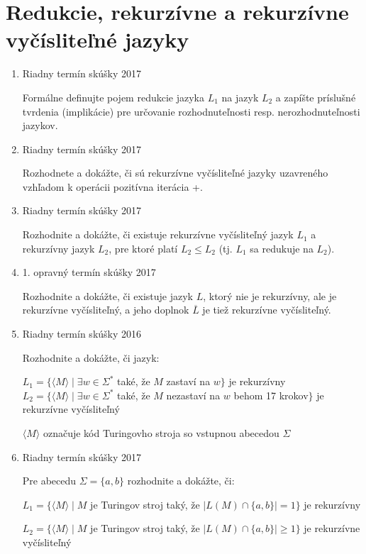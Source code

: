 \documentclass[]{article}
\begin{document}
	\section{Redukcie, rekurzívne a rekurzívne vyčísliteľné jazyky}
	\begin{enumerate}
		\item Riadny termín skúšky 2017
		
		Formálne definujte pojem redukcie jazyka $L_1$ na jazyk $L_2$ a zapíšte príslušné tvrdenia (implikácie) pre určovanie rozhodnuteľnosti resp. nerozhodnuteľnosti jazykov.
		
		\item Riadny termín skúšky 2017
		
		Rozhodnete a dokážte, či sú rekurzívne vyčísliteľné jazyky uzavreného vzhľadom k operácii pozitívna iterácia +.
		
		\item Riadny termín skúšky 2017
		
		Rozhodnite a dokážte, či existuje rekurzívne vyčísliteľný jazyk $L_1$ a rekurzívny jazyk $L_2$, pre ktoré platí $L_2 \leq L_2$ (tj. $L_1$ sa redukuje na $L_2$).
		
		\item 1. opravný termín skúšky 2017
		
		Rozhodnite a dokážte, či existuje jazyk $L$, ktorý nie je rekurzívny, ale je rekurzívne vyčísliteľný, a jeho doplnok $\overline{L}$ je tiež rekurzívne vyčísliteľný.
		
		\item Riadny termín skúšky 2016
		
		Rozhodnite a dokážte, či jazyk:
		
		$L_1 = \{\langle M \rangle \mid \exists w \in \Sigma^*$ také, že $M$ zastaví na $w\}$ je rekurzívny
		$L_2 = \{\langle M \rangle \mid \exists w \in \Sigma^*$ také, že $M$ nezastaví na $w$ behom 17 krokov$\}$ je rekurzívne vyčísliteľný
	
		$\langle M \rangle$ označuje kód Turingovho stroja so vstupnou abecedou $\Sigma$
		
		\item Riadny termín skúšky 2017
		
		Pre abecedu $\Sigma = \{a, b\}$ rozhodnite a dokážte, či:
		
		$L_1 = \{\langle M \rangle \mid M$ je Turingov stroj taký, že $\vert L(M) \cap \{a,b\} \vert = 1\}$ je rekurzívny
		
		$L_2 = \{\langle M \rangle \mid M$ je Turingov stroj taký, že $\vert L(M) \cap \{a,b\} \vert \geq 1\}$ je rekurzívne vyčísliteľný
		

\end{enumerate}
\end{document}
